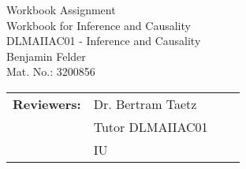 

\def\Mytitle{Workbook for Inference and Causality}
\def\Mysubtitle{Workbook Assignment}
\def\Mycourse{DLMAIIAC01 - Inference and Causality}
\def\Myauthor{Benjamin Felder}
\def\MyMatricNum{3200856}


\def\RNameA{Dr. Bertram Taetz}
\def\RFunctionA{Tutor DLMAIIAC01}
\def\RInstitutionA{IU}

\def\RNameB{}
\def\RFunctionB{}
\def\RInstitutionB{}

\def\RNameC{}
\def\RFunctionC{}
\def\RInstitutionC{}

\thispagestyle{empty}


\vspace{18em}

{\Large \Mysubtitle}\\
{\Huge \Mytitle}\\
{\LARGE \Mycourse}\\
{\LARGE \Myauthor}\\
{\Large Mat. No.: \MyMatricNum}\\

\vspace*{\fill}

\begin{tabular}{p{0.8in} p{1.5in} p{1.5in} p{1.5in}}
    \textbf{Reviewers:} & \RNameA        & \RNameB        & \RNameC        \\
                        & \RFunctionA    & \RFunctionB    & \RFunctionC    \\
                        & \RInstitutionA & \RInstitutionB & \RInstitutionC
\end{tabular}


\clearpage
